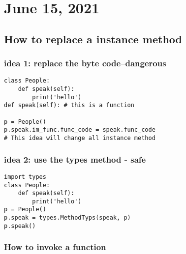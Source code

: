 \documentclass[11pt]{article}
\begin{document}
\section{June 15, 2021}
\label{sec:orgb209710}

\subsection{How to replace a instance method}
\label{sec:org545c0ce}

\subsubsection{idea 1: replace the byte code--dangerous}
\label{sec:org1a52735}
\begin{verbatim}
class People:
    def speak(self):
        print('hello')
def speak(self): # this is a function

p = People()
p.speak.im_func.func_code = speak.func_code
# This idea will change all instance method
\end{verbatim}


\subsubsection{idea 2: use the types method - safe}
\label{sec:org90e9d58}
\begin{verbatim}
import types
class People:
    def speak(self):
        print('hello')
p = People()
p.speak = types.MethodTyps(speak, p)
p.speak()

\end{verbatim}

\subsubsection{How to invoke a function}
\label{sec:org3c916d6}
\end{document}
